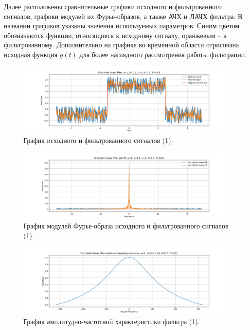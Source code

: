 \documentclass[a4paper, 12pt]{article}
\begin{document}
    Далее расположены сравнительные графики исходного и фильтрованного сигналов, графики модулей их Фурье-образов, а также АЧХ и ЛАЧХ фильтра.
    В названии графиков указаны значения используемых параметров. Синим цветом обозначаются функции, относящиеся к исходному сигналу, оранжевым
    -- к фильтрованному. Дополнительно на графике во временной области отрисована исходная функция $g(t)$ для более наглядного рассмотрения работы
    фильтрации.
    \begin{figure}[H]
        \centering
        \includegraphics[scale=0.4]{1_filtered_linear.png}
        \captionsetup{skip=0pt}
        \caption{График исходного и фильтрованного сигналов (1).}
        \label{fig:filin1}
    \end{figure}
    \begin{figure}[H]
        \centering
        \includegraphics[scale=0.4]{1_abs_filtered_linear.png}
        \captionsetup{skip=0pt}
        \caption{График модулей Фурье-образа исходного и фильтрованного сигналов (1).}
        \label{fig:filinabs1}
    \end{figure}
    \begin{figure}[H]
        \centering
        \includegraphics[scale=0.4]{1_afr_filtered_linear.png}
        \captionsetup{skip=0pt}
        \caption{График амплитудно-частотной характеристики фильтра (1).}
        \label{fig:filinafr1}
    \end{figure}
\end{document}
